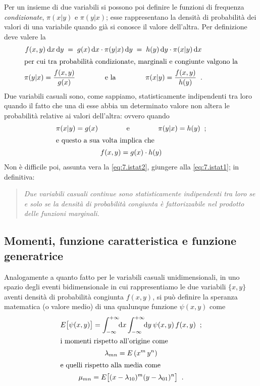 %
Per un insieme di due variabili si possono poi definire le
funzioni di frequenza \emph{condizionate}, $\pi(x|y)$ e
$\pi(y|x)$; esse rappresentano la densit\`a di probabilit\`a
dei valori di una variabile quando gi\`a si conosce il
valore dell'altra.  Per definizione deve valere la
\begin{gather*}
  f(x,y) \: \de x \, \de y \; = \; g(x) \, \de x \cdot
  \pi(y|x) \, \de y \; = \; h(y) \, \de y \cdot \pi(x|y) \,
  \de x \\
  \intertext{per cui tra probabilit\`a condizionate,
    marginali e congiunte valgono la}
  \pi(y|x) = \frac{ f(x,y) }{ g(x) }
  \makebox[35mm]{e la}
  \pi(x|y) = \frac{ f(x,y) }{ h(y) } \peq .
\end{gather*}
Due variabili casuali sono, come sappiamo, statisticamente
indipendenti tra loro quando il fatto che una di esse abbia
un determinato valore non altera le probabilit\`a relative
ai valori dell'altra: ovvero quando
\begin{gather}
  \pi(x|y) = g(x)
  \makebox[30mm]{e}
  \pi(y|x) = h(y) \peq ; \label{eq:7.istat1} \\
  \intertext{e questo a sua volta implica che}
  f(x,y) = g(x) \cdot h(y) \label{eq:7.istat2}
\end{gather}
Non \`e difficile poi, assunta vera la \eqref{eq:7.istat2},
giungere alla \eqref{eq:7.istat1}; in definitiva:
%
\begin{quote}
  \textit{Due variabili casuali continue sono
    statisticamente indipendenti tra loro se e solo se la
    densit\`a di probabilit\`a congiunta \`e fattorizzabile
    nel prodotto delle funzioni marginali.}
\end{quote}%
%

\subsection{Momenti, funzione caratteristica e funzione
  generatrice}
Analogamente a quanto fatto per le variabili casuali
unidimensionali, in uno spazio degli eventi bidimensionale
in cui rappresentiamo le due variabili $\{x,y\}$ aventi
densit\`a di probabilit\`a congiunta $f(x,y)$, si
pu\`o definire la speranza matematica%
(o valore medio) di una qualunque funzione $\psi(x,y)$ come
\begin{gather*}
  E \bigl[ \psi(x,y) \bigr] = \int_{-\infty}^{+\infty} \!
  \! \de x \int_{-\infty}^{+\infty} \! \! \de y \: \psi(x,y)
  \, f(x,y) \peq ; \\
  \intertext{i momenti%
    \index{momenti|(}
    rispetto all'origine come}
  \lambda_{mn} = E \left( x^m \, y^n \right) \\
  \intertext{e quelli rispetto alla media come}
  \mu_{mn} = E \bigl[ ( x - \lambda_{10} )^m ( y -
  \lambda_{01} )^n \bigr] \peq .
\end{gather*}%

